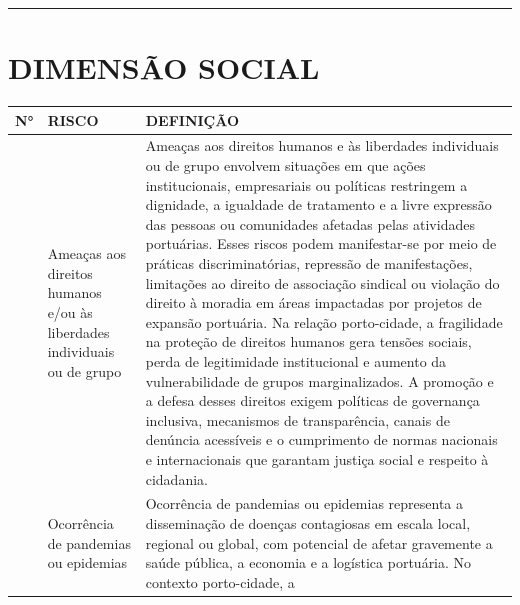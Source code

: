 \documentclass[
  portuguese,
  letterpaper,
  DIV=11,
  numbers=noendperiod]{scrreprt}
\begin{document}
\begin{center}\rule{0.5\linewidth}{0.5pt}\end{center}

\section{DIMENSÃO SOCIAL}\label{dimensuxe3o-social-1}

\begin{longtable}[]{@{}
  >{\raggedright\arraybackslash}p{}
  >{\raggedright\arraybackslash}p{}
  >{\raggedright\arraybackslash}p{}@{}}
\toprule\noalign{}
\begin{minipage}[b]{\linewidth}\raggedright
N°
\end{minipage} & \begin{minipage}[b]{\linewidth}\raggedright
RISCO
\end{minipage} & \begin{minipage}[b]{\linewidth}\raggedright
DEFINIÇÃO
\end{minipage} \\
\midrule\noalign{}
\endhead
\bottomrule\noalign{}
\endlastfoot
1 & Ameaças aos direitos humanos e/ou às liberdades individuais ou de
grupo & Ameaças aos direitos humanos e às liberdades individuais ou de
grupo envolvem situações em que ações institucionais, empresariais ou
políticas restringem a dignidade, a igualdade de tratamento e a livre
expressão das pessoas ou comunidades afetadas pelas atividades
portuárias. Esses riscos podem manifestar-se por meio de práticas
discriminatórias, repressão de manifestações, limitações ao direito de
associação sindical ou violação do direito à moradia em áreas impactadas
por projetos de expansão portuária. Na relação porto-cidade, a
fragilidade na proteção de direitos humanos gera tensões sociais, perda
de legitimidade institucional e aumento da vulnerabilidade de grupos
marginalizados. A promoção e a defesa desses direitos exigem políticas
de governança inclusiva, mecanismos de transparência, canais de denúncia
acessíveis e o cumprimento de normas nacionais e internacionais que
garantam justiça social e respeito à cidadania. \\
2 & Ocorrência de pandemias ou epidemias & Ocorrência de pandemias ou
epidemias representa a disseminação de doenças contagiosas em escala
local, regional ou global, com potencial de afetar gravemente a saúde
pública, a economia e a logística portuária. No contexto porto-cidade, a

\end{longtable}
\end{document}
